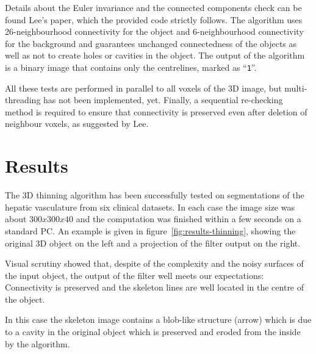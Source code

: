 \documentclass{InsightArticle}
\begin{document}
Details about the Euler invariance and the connected components check can be found Lee's paper,  which the provided code strictly follows. The algorithm uses 26-neighbourhood connectivity for the object and 6-neighbourhood connectivity for the background and guarantees unchanged connectedness of the objects as well as not to create holes or cavities in the object. The output of the algorithm is a binary image that contains only the centrelines, marked as "`\texttt{1}"'. 

All these tests are performed in parallel to all voxels of the 3D image, but multi-threading has not been implemented, yet. Finally, a sequential re-checking method is required to ensure that connectivity is preserved even after deletion of neighbour voxels, as suggested by Lee.


\section{Results}
The 3D thinning algorithm has been successfully tested on segmentations of the hepatic vasculature from six clinical datasets. In each case the image size was about $300x300x40$ and the computation was finished within a few seconds on a standard PC. An example is given in figure~\ref{fig:results-thinning}, showing the original 3D object on the left and a projection of the filter output on the right.

Visual scrutiny showed that, despite of the complexity and the noisy surfaces of the input object, the output of the filter well meets our expectations: Connectivity is preserved and the skeleton lines are well located in the centre of the object.

In this case the skeleton image contains a blob-like structure (arrow) which is due to a cavity in the original object which is preserved and eroded from the inside by the algorithm.
\end{document}
